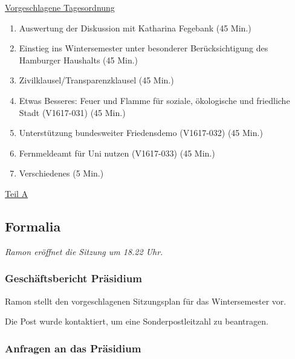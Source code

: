 \documentclass[ngerman,headheight=70pt]{scrartcl}
\begin{document}
    \newpage
    \underline{Vorgeschlagene Tagesordnung}
    \begin{enumerate}[label={\textbf{Top \theenumi}},leftmargin=*]
        \item Auswertung der Diskussion mit Katharina Fegebank  (45 Min.)
        \item Einstieg ins Wintersemester unter besonderer Berücksichtigung des Hamburger Haushalts (45 Min.)
        \item Zivilklausel/Transparenzklausel (45 Min.)
        \item Etwas Besseres: Feuer und Flamme für soziale, ökologische und friedliche Stadt (V1617-031) (45 Min.)
        \item Unterstützung bundesweiter Friedensdemo (V1617-032) (45 Min.)
        \item Fernmeldeamt für Uni nutzen (V1617-033) (45 Min.)
        \item Verschiedenes (5 Min.)
    \end{enumerate}

    \newpage


    {\Large \underline{Teil A}}

    \subsection{Formalia}

    \textit{Ramon eröffnet die Sitzung um 18.22 Uhr.}

    \subsubsection{Geschäftsbericht Präsidium}

    Ramon stellt den vorgeschlagenen Sitzungsplan für das Wintersemester
    vor.

    Die Post wurde kontaktiert, um eine Sonderpostleitzahl zu beantragen.

    \subsubsection{Anfragen an das Präsidium}
\end{document}
